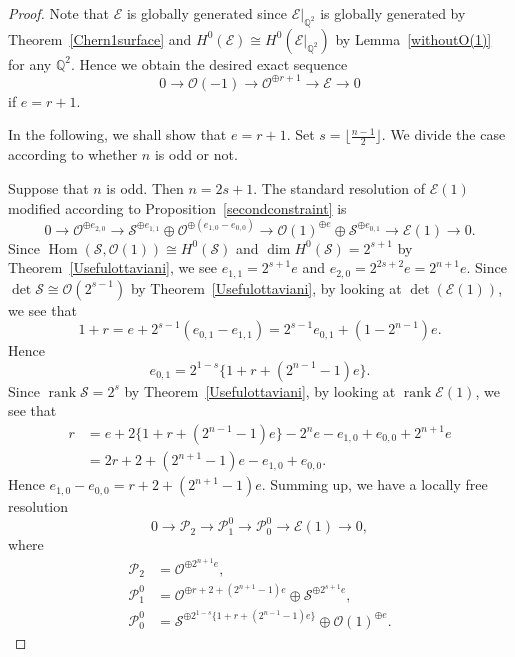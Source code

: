 \documentclass[a4paper,12pt]{amsart}
\DeclareMathOperator{\Hom}{Hom}
\DeclareMathOperator{\rk}{rank}
\begin{document}
\begin{proof}
Note that $\mathcal{E}$ is globally generated
since $\mathcal{E}|_{\mathbb{Q}^2}$ is globally generated
by Theorem~\ref{Chern1surface} and $H^0(\mathcal{E})\cong H^0(\mathcal{E}|_{\mathbb{Q}^2})$
by Lemma~\ref{withoutO(1)}
for any 
$\mathbb{Q}^2$.
Hence we obtain the desired exact sequence
\[0\to\mathcal{O}(-1)\to \mathcal{O}^{\oplus r+1}\to \mathcal{E}\to 0
\]
if $e=r+1$.

In the following, we shall show that $e=r+1$.
Set $s=\lfloor \frac{n-1}{2}\rfloor$.
We divide the case according to whether $n$ is odd or not.

Suppose that $n$ is odd. Then $n=2s+1$.
The standard resolution of $\mathcal{E}(1)$
modified according to Proposition~\ref{secondconstraint}
is 
\[
0
\to \mathcal{O}^{\oplus e_{2,0}}
\to \mathcal{S}^{\oplus e_{1,1}}\oplus\mathcal{O}^{\oplus (e_{1,0}-e_{0,0})}
\to \mathcal{O}(1)^{\oplus e}\oplus\mathcal{S}^{\oplus e_{0,1}}
\to \mathcal{E}(1)\to 0.
\]
Since $\Hom(\mathcal{S},\mathcal{O}(1))\cong H^0(\mathcal{S})$
and $\dim H^0(\mathcal{S})=2^{s+1}$ by Theorem~\ref{Usefulottaviani}, 
we 
see 
$e_{1,1}=2^{s+1}e$ and 
$e_{2,0}=2^{2s+2}e=2^{n+1}e$.
Since $\det\mathcal{S}\cong \mathcal{O}(2^{s-1})$ by Theorem~\ref{Usefulottaviani}, by looking at $\det(\mathcal{E}(1))$,
we see that 
\[1+r=e+2^{s-1}(e_{0,1}-e_{1,1})=2^{s-1}e_{0,1}+(1-2^{n-1})e.\]
Hence 
\[e_{0,1}=2^{1-s}\{1+r+(2^{n-1}-1)e\}.
\]
Since $\rk \mathcal{S}=2^s$ by Theorem~\ref{Usefulottaviani},
by looking at $\rk\mathcal{E}(1)$, we see that 
\begin{equation*}
\begin{split}
r&=e+2\{1+r+(2^{n-1}-1)e\}-2^ne
-e_{1,0}
+e_{0,0}+2^{n+1}e\\
&=
2r+2+(2^{n+1}-1)e-e_{1,0}+e_{0,0}.
\end{split}
\end{equation*}
Hence $e_{1,0}-e_{0,0}=r+2+(2^{n+1}-1)e$.
Summing up, we have a locally free resolution
\[
0
\to 
\mathcal{P}_2
\to 
\mathcal{P}^{0}_1
\to 
\mathcal{P}^{0}_0
\to \mathcal{E}(1)\to 0,
\]
where 
\begin{equation*}
\begin{split}
\mathcal{P}_2&=\mathcal{O}^{\oplus 2^{n+1}e},\\
\mathcal{P}^{0}_1&=\mathcal{O}^{\oplus r+2+(2^{n+1}-1)e}\oplus\mathcal{S}^{\oplus 2^{s+1}e},\\
\mathcal{P}^{0}_0&=\mathcal{S}^{\oplus 2^{1-s}\{1+r+(2^{n-1}-1)e\}}\oplus\mathcal{O}(1)^{\oplus e}.
\end{split}
\end{equation*}

\end{proof}
\end{document}
